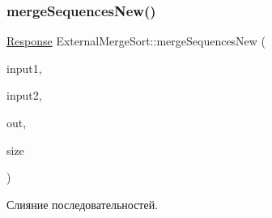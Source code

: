 \subsubsection{\texorpdfstring{merge\+Sequences\+New()}{mergeSequencesNew()}}
{\footnotesize\ttfamily \hyperlink{_structures_8h_ab3500e5d3c915d1b5cc58dcab8673fd4}{Response} External\+Merge\+Sort\+::merge\+Sequences\+New (\begin{DoxyParamCaption}\item[{\hyperlink{class_file_manager}{File\+Manager} $\ast$}]{input1,  }\item[{\hyperlink{class_file_manager}{File\+Manager} $\ast$}]{input2,  }\item[{\hyperlink{class_file_manager}{File\+Manager} $\ast$}]{out,  }\item[{long long}]{size }\end{DoxyParamCaption})\hspace{0.3cm}{\ttfamily [private]}}



Слияние последовательностей. 


